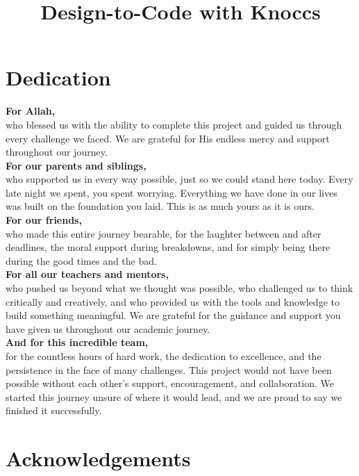 \documentclass[12pt,twosided]{report}
\title{Design-to-Code with Knoccs}
\begin{document}

\chapter*{Dedication}

\textbf{For Allah,} \\
who blessed us with the ability to complete this project and guided us through every challenge we faced. We are grateful for His endless mercy and support throughout our journey.\\[1em]
\textbf{For our parents and siblings,} \\
who supported us in every way possible, just so we could stand here today. Every late night we spent, you spent worrying. Everything we have done in our lives was built on the foundation you laid. This is as much yours as it is ours.\\[1em]
\textbf{For our friends,} \\
who made this entire journey bearable, for the laughter between and after deadlines, the moral support during breakdowns, and for simply being there during the good times and the bad.\\[1em]
\textbf{For all our teachers and mentors,} \\
who pushed us beyond what we thought was possible, who challenged us to think critically and creatively, and who provided us with the tools and knowledge to build something meaningful. We are grateful for the guidance and support you have given us throughout our academic journey.\\[1em]
\textbf{And for this incredible team,} \\
for the countless hours of hard work, the dedication to excellence, and the persistence in the face of many challenges. This project would not have been possible without each other's support, encouragement, and collaboration. We started this journey unsure of where it would lead, and we are proud to say we finished it successfully.

\chapter*{Acknowledgements}
\end{document}

